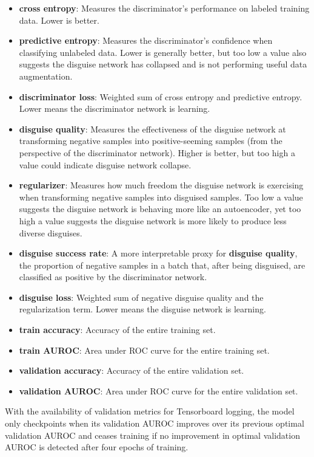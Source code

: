 \documentclass{proc}
\begin{document}
\begin{itemize}
\item{\textbf{cross entropy}}: Measures the discriminator's performance on labeled training data. Lower is better.
\item{\textbf{predictive entropy}}: Measures the discriminator's confidence when classifying unlabeled data. Lower is generally better, but too low a value also suggests the disguise network has collapsed and is not performing useful data augmentation.
\item{\textbf{discriminator loss}}: Weighted sum of cross entropy and predictive entropy. Lower means the discriminator network is learning.
\item{\textbf{disguise quality}}: Measures the effectiveness of the disguise network at transforming negative samples into positive-seeming samples (from the perspective of the discriminator network). Higher is better, but too high a value could indicate disguise network collapse.
\item{\textbf{regularizer}}: Measures how much freedom the disguise network is exercising when transforming negative samples into disguised samples. Too low a value suggests the disguise network is behaving more like an autoencoder, yet too high a value suggests the disguise network is more likely to produce less diverse disguises.
\item{\textbf{disguise success rate}}: A more interpretable proxy for \textbf{disguise quality}, the proportion of negative samples in a batch that, after being disguised, are classified as positive by the discriminator network.
\item{\textbf{disguise loss}}: Weighted sum of negative disguise quality and the regularization term. Lower means the disguise network is learning.
\item{\textbf{train accuracy}}: Accuracy of the entire training set.
\item{\textbf{train AUROC}}: Area under ROC curve for the entire training set.
\item{\textbf{validation accuracy}}: Accuracy of the entire validation set.
\item{\textbf{validation AUROC}}: Area under ROC curve for the entire validation set.
\end{itemize}

With the availability of validation metrics for Tensorboard logging, the model only checkpoints when its validation AUROC improves over its previous optimal validation AUROC and ceases training if no improvement in optimal validation AUROC is detected after four epochs of training.
\end{document}
